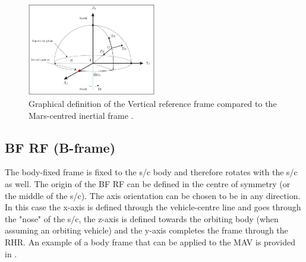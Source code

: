 \begin{figure}[!ht]
\centering
\includegraphics[width=0.5\textwidth]{figures/reference_frames/vcne_mooij2013fd.jpg}
\caption{Graphical definition of the Vertical reference frame compared to the Mars-centred inertial frame \cite{mooij2013fd}.}
\label{fig:vcne_mooij2013fd}
\end{figure} 



\subsection{\acl{BF} \ac{RF} (B-frame)}
\label{subsec:BF}
The body-fixed  frame is fixed to the \ac{s/c} body and therefore rotates with the \ac{s/c} as well. The origin of the \ac{BF} \ac{RF} can be defined in the centre of symmetry (or the middle of the \ac{s/c}). The axis orientation can be chosen to be in any direction. In this case the x-axis is defined through the vehicle-centre line and goes through the "nose" of the \ac{s/c}, the z-axis is defined towards the orbiting body (when assuming an orbiting vehicle) and the y-axis completes the frame through the \ac{RHR}. An example of a body frame that can be applied to the \ac{MAV} is provided in . 


